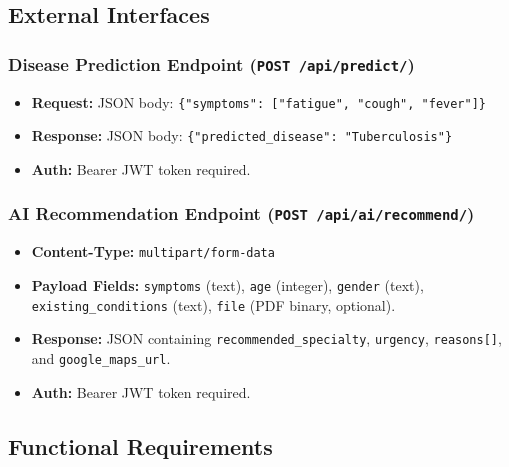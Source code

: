 \subsection{External Interfaces}

\subsubsection{Disease Prediction Endpoint (\texttt{POST /api/predict/})}
\begin{itemize}
    \item \textbf{Request:} JSON body: \texttt{\{"symptoms": ["fatigue", "cough", "fever"]\}}
    \item \textbf{Response:} JSON body: \texttt{\{"predicted\_disease": "Tuberculosis"\}}
    \item \textbf{Auth:} Bearer JWT token required.
\end{itemize}

\subsubsection{AI Recommendation Endpoint (\texttt{POST /api/ai/recommend/})}
\begin{itemize}
    \item \textbf{Content-Type:} \texttt{multipart/form-data}
    \item \textbf{Payload Fields:} \texttt{symptoms} (text), \texttt{age} (integer), \texttt{gender} (text), \texttt{existing\_conditions} (text), \texttt{file} (PDF binary, optional).
    \item \textbf{Response:} JSON containing \texttt{recommended\_specialty}, \texttt{urgency}, \texttt{reasons[]}, and \texttt{google\_maps\_url}.
    \item \textbf{Auth:} Bearer JWT token required.
\end{itemize}

\subsection{Functional Requirements}

